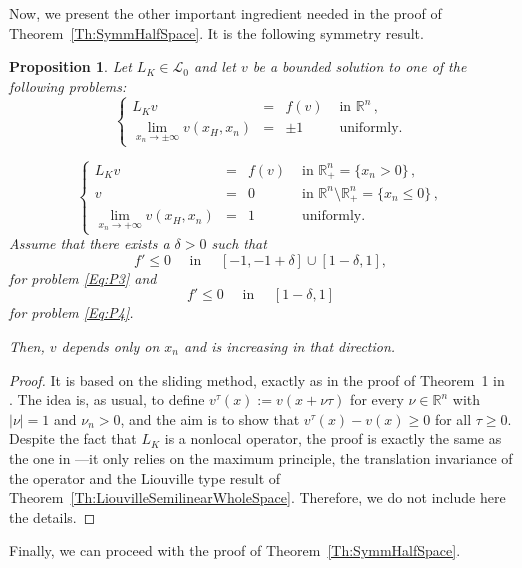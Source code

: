 \documentclass[12pt,reqno]{amsart}
\makeatletter
\newtheorem{proposition}[theorem]{Proposition}
\theoremstyle{definition}
\theoremstyle{remark}
\newcommand{\con}[1]{\mathbb{#1}}
\newcommand{\R}{\con{R}} %
\newcommand{\lcal}{\mathcal{L}}
\newcommand{\reqnomode}{\tagsleft@false\let\veqno\@@eqno}
\newcommand\beqc[1]{\left\{\begin{array}{#1}}
\newcommand\eeqc{\end{array} \right.}
\def\PDEsystem{rcll}
\def\ds{\displaystyle}
\numberwithin{equation}{section}
\makeatother
\begin{document}
Now, we present the other important ingredient needed in the proof of Theorem~\ref{Th:SymmHalfSpace}. It is the following symmetry result.

\begin{proposition}
	\label{Prop:HalfSpaceLimUnif}
	Let $L_K \in \lcal_0$ and let $v$ be a bounded solution to one of the following problems:
	\begin{equation}
	\tag{P3}
	\label{Eq:P3}
	\beqc{\PDEsystem}
	L_K  v &=& f(v)  &\textrm{ in }\R^n\,,\\
	\ds \lim_{x_n \to \pm \infty} v(x_H,x_n) &=& \pm 1 \,\,\, &\textrm{ uniformly}.
	\eeqc
	\end{equation}
	
	\begin{equation}
	\tag{P4}
	\label{Eq:P4}
	\beqc{\PDEsystem}
	L_K  v &=& f(v)  &\textrm{ in }\R^n_+ = \{ x_n>0\} \,,\\
	v &=& 0  &\textrm{ in } \R^n \setminus \R^n_+ = \{ x_n\leq 0\}\,,\\
	\ds \lim_{x_n \to + \infty} v(x_H,x_n) &=& 1 \,\,\, &\textrm{ uniformly}.
	\eeqc
	\end{equation}
	\reqnomode
	Assume that there exists a $\delta > 0$ such that
	$$ f' \leq 0 \quad \text{ in } \quad [-1,-1+\delta]\cup[1-\delta,1], $$
	for problem \eqref{Eq:P3} and
	$$ f' \leq 0 \quad \text{ in } \quad [1-\delta,1] $$
	for problem \eqref{Eq:P4}.
	
	Then, $v$ depends only on $x_n$ and is increasing in that direction.
\end{proposition}

\begin{proof}
	It is based on the sliding method, exactly as in the proof of Theorem~1 in \cite{BerestyckiHamelMonneau}. The idea is, as usual, to define $ v^\tau(x) := v(x+\nu \tau) $ for every $\nu\in\R^n$ with $|\nu|=1$ and $\nu_n>0$, and the aim is to show that $v^\tau(x)-v(x)\geq 0$ for all $\tau\geq 0$. Despite the fact that $L_K$ is a nonlocal operator, the proof is exactly the same as the one in \cite{BerestyckiHamelMonneau} ---it only relies on the maximum principle, the translation invariance of the operator and the Liouville type result of Theorem~\ref{Th:LiouvilleSemilinearWholeSpace}. Therefore, we do not include here the details.
\end{proof}






Finally, we can proceed with the proof of Theorem~\ref{Th:SymmHalfSpace}.
\end{document}
